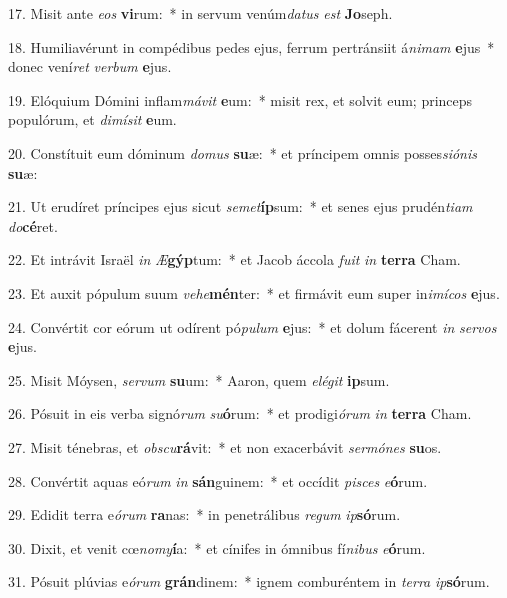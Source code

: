 17. Misit ante \textit{e}\textit{os} \textbf{vi}rum:~*  in servum venúm\textit{da}\textit{tus} \textit{est} \textbf{Jo}seph.\

18. Humiliavérunt in compédibus pedes ejus, ferrum pertránsiit á\textit{ni}\textit{mam} \textbf{e}jus~*  donec vení\textit{ret} \textit{ver}\textit{bum} \textbf{e}jus.\

19. Elóquium Dómini inflam\textit{má}\textit{vit} \textbf{e}um:~*  misit rex, et solvit eum; princeps populórum, et \textit{di}\textit{mí}\textit{sit} \textbf{e}um.\

20. Constítuit eum dóminum \textit{do}\textit{mus} \textbf{su}æ:~*  et príncipem omnis posses\textit{si}\textit{ó}\textit{nis} \textbf{su}æ:\

21. Ut erudíret príncipes ejus sicut \textit{se}\textit{met}\textbf{íp}sum:~*  et senes ejus prudén\textit{ti}\textit{am} \textit{do}\textbf{cé}ret.\

22. Et intrávit Israël \textit{in} \textit{Æ}\textbf{gýp}tum:~*  et Jacob áccola \textit{fu}\textit{it} \textit{in} \textbf{ter}\textbf{ra} Cham.\

23. Et auxit pópulum suum \textit{ve}\textit{he}\textbf{mén}ter:~*  et firmávit eum super in\textit{i}\textit{mí}\textit{cos} \textbf{e}jus.\

24. Convértit cor eórum ut odírent pó\textit{pu}\textit{lum} \textbf{e}jus:~*  et dolum fácerent \textit{in} \textit{ser}\textit{vos} \textbf{e}jus.\

25. Misit Móysen, \textit{ser}\textit{vum} \textbf{su}um:~*  Aaron, quem \textit{e}\textit{lé}\textit{git} \textbf{ip}sum.\

26. Pósuit in eis verba signó\textit{rum} \textit{su}\textbf{ó}rum:~*  et prodigi\textit{ó}\textit{rum} \textit{in} \textbf{ter}\textbf{ra} Cham.\

27. Misit ténebras, et \textit{obs}\textit{cu}\textbf{rá}vit:~*  et non exacerbávit \textit{ser}\textit{mó}\textit{nes} \textbf{su}os.\

28. Convértit aquas eó\textit{rum} \textit{in} \textbf{sán}guinem:~*  et occídit \textit{pi}\textit{sces} \textit{e}\textbf{ó}rum.\

29. Edidit terra e\textit{ó}\textit{rum} \textbf{ra}nas:~*  in penetrálibus \textit{re}\textit{gum} \textit{ip}\textbf{só}rum.\

30. Dixit, et venit cœ\textit{no}\textit{my}\textbf{í}a:~*  et cínifes in ómnibus fí\textit{ni}\textit{bus} \textit{e}\textbf{ó}rum.\

31. Pósuit plúvias e\textit{ó}\textit{rum} \textbf{grán}dinem:~*  ignem comburéntem in \textit{ter}\textit{ra} \textit{ip}\textbf{só}rum.\

